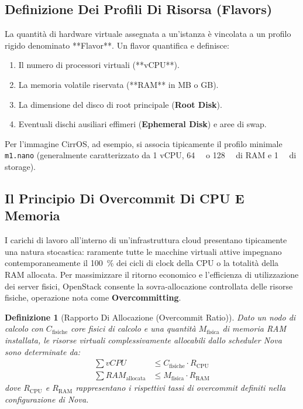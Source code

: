 \documentclass[11pt, a4paper]{article}
\newtheorem{theorem}{Definizione}
\begin{document}
\subsection{Definizione Dei Profili Di Risorsa (Flavors)}

La quantità di hardware virtuale assegnata a un'istanza è vincolata a un profilo rigido denominato **Flavor**. Un flavor quantifica e definisce:
\begin{enumerate}[noitemsep]
    \item Il numero di processori virtuali (**vCPU**).
    \item La memoria volatile riservata (**RAM** in MB o GB).
    \item La dimensione del disco di root principale (\textbf{Root Disk}).
    \item Eventuali dischi ausiliari effimeri (\textbf{Ephemeral Disk}) e aree di swap.
\end{enumerate}

Per l'immagine CirrOS, ad esempio, si associa tipicamente il profilo minimale \texttt{m1.nano} (generalmente caratterizzato da 1 vCPU, \SI{64}{\mega\byte} o \SI{128}{\mega\byte} di RAM e \SI{1}{\giga\byte} di storage).


\subsection{Il Principio Di Overcommit Di CPU E Memoria}

I carichi di lavoro all'interno di un'infrastruttura cloud presentano tipicamente una natura stocastica: raramente tutte le macchine virtuali attive impegnano contemporaneamente il \SI{100}{\percent} dei cicli di clock della CPU o la totalità della RAM allocata. Per massimizzare il ritorno economico e l'efficienza di utilizzazione dei server fisici, OpenStack consente la sovra-allocazione controllata delle risorse fisiche, operazione nota come \textbf{Overcommitting}.

\begin{theorem}[Rapporto Di Allocazione (Overcommit Ratio)]
Dato un nodo di calcolo con $C_{\text{fisiche}}$ core fisici di calcolo e una quantità $M_{\text{fisica}}$ di memoria RAM installata, le risorse virtuali complessivamente allocabili dallo scheduler Nova sono determinate da:
\begin{align}
    \sum vCPU &\le C_{\text{fisiche}} \cdot R_{\text{CPU}} \\
    \sum RAM_{\text{allocata}} &\le M_{\text{fisica}} \cdot R_{\text{RAM}}
\end{align}
dove $R_{\text{CPU}}$ e $R_{\text{RAM}}$ rappresentano i rispettivi tassi di overcommit definiti nella configurazione di Nova.
\end{theorem}
\end{document}
